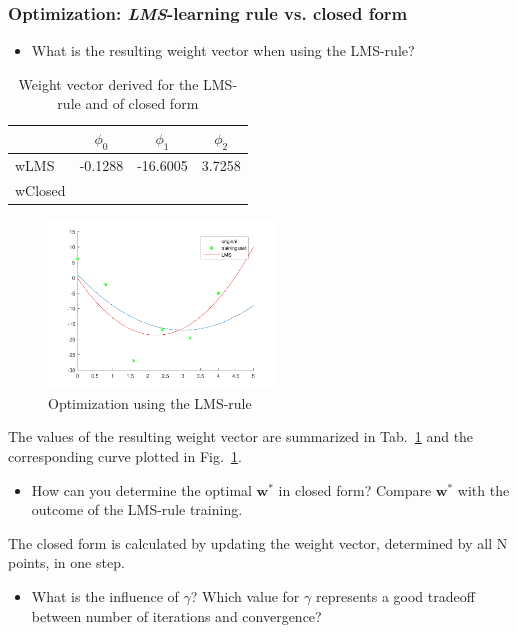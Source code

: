 \documentclass[a4]{article}
\begin{document}
\subsubsection{Optimization: \emph{LMS}-learning rule vs. closed form}
%
%
\begin{itemize}
	\item What is the resulting weight vector when using the LMS-rule?
\end{itemize}
\begin{table} [tbp!]
	\caption{Weight vector derived for the LMS-rule and of closed form}
	\centering
	\label{table:wLMS}
	\begin{tabular}{l c c c}
		\toprule
		& $\phi_0$ & $\phi_1$ & $\phi_2$ \\ 
		\midrule
		wLMS & -0.1288 & -16.6005 & 3.7258 \\ %
		wClosed &  &  &\\
		\bottomrule
	\end{tabular}
\end{table}
\begin{figure}[!h]
	\centering
	\includegraphics[width=6cm]{figures/LMS.pdf}
	\caption{Optimization using the LMS-rule}
	\label{fig:122_LMS}
\end{figure}
The values of the resulting weight vector are summarized in Tab.~\ref{table:wLMS} and the corresponding curve plotted in Fig.~\ref{fig:122_LMS}.

\begin{itemize}
	\item How can you determine the optimal ${\mathbf w}^*$ in closed form? Compare ${\mathbf w}^*$ with the outcome of the LMS-rule training.
\end{itemize}
The closed form is calculated by updating the weight vector, determined by all N points, in one step.
\begin{itemize}	
	\item What is the influence of $\gamma$? Which value for $\gamma$ represents a good tradeoff between number of iterations and convergence? 
\end{itemize}
\end{document}
